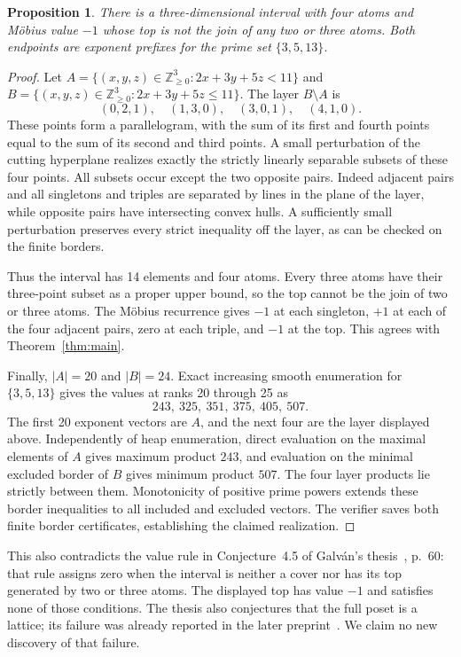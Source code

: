 \documentclass[11pt]{article}
\newtheorem{proposition}[theorem]{Proposition}
\theoremstyle{remark}
\newcommand{\NN}{\mathbb Z_{\geq0}}
\begin{document}
\begin{proposition}\label{prop:fouratoms}
There is a three-dimensional interval with four atoms and M\"obius value
$-1$ whose top is not the join of any two or three atoms. Both endpoints
are exponent prefixes for the prime set $\{3,5,13\}$.
\end{proposition}
\begin{proof}
Let $A=\{(x,y,z)\in\NN^3:2x+3y+5z<11\}$ and
$B=\{(x,y,z)\in\NN^3:2x+3y+5z\leq11\}$. The layer $B\setminus A$ is
\[
 (0,2,1),\quad(1,3,0),\quad(3,0,1),\quad(4,1,0).
\]
These points form a parallelogram, with the sum of its first and fourth
points equal to the sum of its second and third points. A small perturbation
of the cutting hyperplane realizes exactly the strictly linearly separable
subsets of these four points. All subsets occur except the two opposite
pairs. Indeed adjacent pairs and all singletons and triples are separated
by lines in the plane of the layer, while opposite pairs have intersecting
convex hulls. A sufficiently small perturbation preserves every strict
inequality off the layer, as can be checked on the finite borders.

Thus the interval has 14 elements and four atoms. Every three atoms have
their three-point subset as a proper upper bound, so the top cannot be
the join of two or three atoms. The M\"obius recurrence gives $-1$ at
each singleton, $+1$ at each of the four adjacent pairs, zero at each
triple, and $-1$ at the top. This agrees with Theorem~\ref{thm:main}.

Finally, $|A|=20$ and $|B|=24$. Exact increasing smooth enumeration for
$\{3,5,13\}$ gives the values at ranks 20 through 25 as
\[
 243,\ 325,\ 351,\ 375,\ 405,\ 507.
\]
The first 20 exponent vectors are $A$, and the next four are the layer
displayed above. Independently of heap enumeration, direct evaluation on
the maximal elements of $A$ gives maximum product $243$, and evaluation
on the minimal excluded border of $B$ gives minimum product $507$.
The four layer products lie strictly between them. Monotonicity of
positive prime powers extends these border inequalities to all included
and excluded vectors. The verifier saves both finite border certificates,
establishing the claimed realization.
\end{proof}

This also contradicts the value rule in Conjecture~4.5 of
Galv\'an's thesis~\cite{GalvanThesis}, p.~60: that rule assigns zero
when the interval is neither a cover nor has its top generated by two
or three atoms. The displayed top has value $-1$ and satisfies none of
those conditions. The thesis also conjectures that the full poset is a
lattice; its failure was already reported in the later preprint~\cite{EG}.
We claim no new discovery of that failure.
\end{document}
